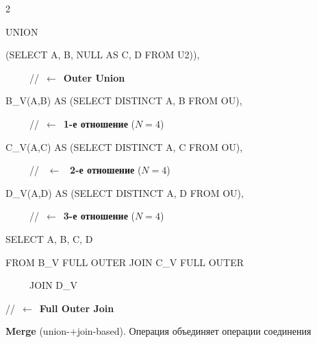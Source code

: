 \begin{multicols}{2}
\noindent

{\sf  \hspace*{6pt}UNION}



\noindent

{\sf   \hspace*{3pt}(SELECT  A, B, NULL AS C, D FROM U2))},



\noindent

\ \ \ \ \ //\ $\leftarrow$\ \textbf{Outer Union}



\noindent

{\sf   \hspace*{3pt}B\_V(A,B) AS (SELECT DISTINCT A, B FROM OU)},





\noindent

\ \ \ \ \  //\ $\leftarrow$\ \textbf{1-е отношение} ($N=4$)



\noindent

  {\sf \hspace*{3pt}C\_V(A,C) AS (SELECT DISTINCT A, C FROM OU)},



  \noindent

\ \ \ \ \  // \ $\leftarrow$\ \textbf{ 2-е отношение} ($N=4$)



\noindent

  {\sf \hspace*{3pt}D\_V(A,D) AS (SELECT DISTINCT A, D FROM OU),}



\noindent

\ \ \ \ \ //\ $\leftarrow$\ \textbf{3-е отношение} ($N=4$)



\noindent

  {\sf SELECT A, B, C, D}



\noindent

  {\sf FROM B\_V FULL OUTER JOIN C\_V FULL OUTER



  \noindent

  \ \ \ \ \  JOIN D\_V}

  //\ $\leftarrow$\ \textbf{Full Outer Join}



 \textbf{Merge} (union-\;+\;join-based). Операция объединяет операции соединения


\end{multicols}
